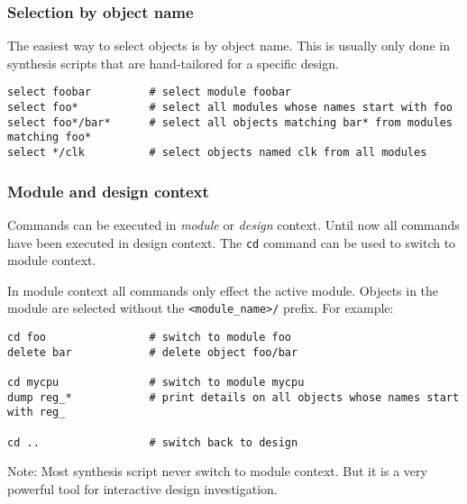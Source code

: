 \subsubsection{Selection by object name}

\begin{frame}[fragile]{\subsubsecname}
The easiest way to select objects is by object name. This is usually only done
in synthesis scripts that are hand-tailored for a specific design.

\bigskip
\begin{lstlisting}[xleftmargin=0.5cm, basicstyle=\ttfamily\fontsize{8pt}{10pt}\selectfont, language=ys]
select foobar         # select module foobar
select foo*           # select all modules whose names start with foo
select foo*/bar*      # select all objects matching bar* from modules matching foo*
select */clk          # select objects named clk from all modules
\end{lstlisting}
\end{frame}

\subsubsection{Module and design context}

\begin{frame}[fragile]{\subsubsecname}
Commands can be executed in {\it module\/} or {\it design\/} context. Until now all
commands have been executed in design context. The {\tt cd} command can be used
to switch to module context.

\bigskip
In module context all commands only effect the active module. Objects in the module
are selected without the {\tt <module\_name>/} prefix. For example:

\bigskip
\begin{lstlisting}[xleftmargin=0.5cm, basicstyle=\ttfamily\fontsize{8pt}{10pt}\selectfont, language=ys]
cd foo                # switch to module foo
delete bar            # delete object foo/bar

cd mycpu              # switch to module mycpu
dump reg_*            # print details on all objects whose names start with reg_

cd ..                 # switch back to design
\end{lstlisting}

\bigskip
Note: Most synthesis script never switch to module context. But it is a very powerful
tool for interactive design investigation.
\end{frame}

